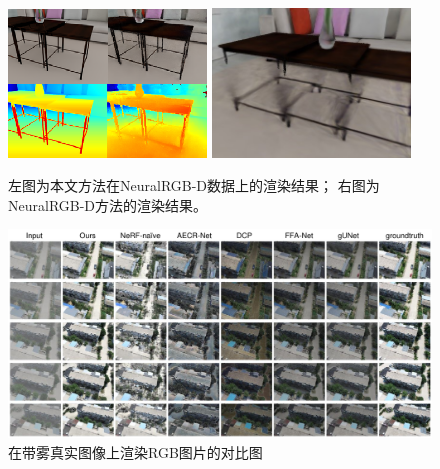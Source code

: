 \begin{figure}[ht]
	\begin{center}
	\includegraphics[width=0.47\textwidth]{undergraduate-thesis/images/experiments/omninerf-qualitative.png}
	\includegraphics[width=0.47\textwidth]{undergraduate-thesis/images/experiments/neural-rgbd failure case.jpg}
	\end{center}
	\caption{左图为本文方法在NeuralRGB-D数据上的渲染结果； 右图为NeuralRGB-D方法的渲染结果。}
	\label{fig:omninerf-qualitative}
\end{figure}

\begin{figure}[ht]
    \centering
    \includegraphics[width=\textwidth]{undergraduate-thesis/images/experiments/exp-appearance-export.pdf}
    \caption{在带雾真实图像上渲染RGB图片的对比图}
    \label{fig:dehazenerf-real-rgb}
\end{figure}

